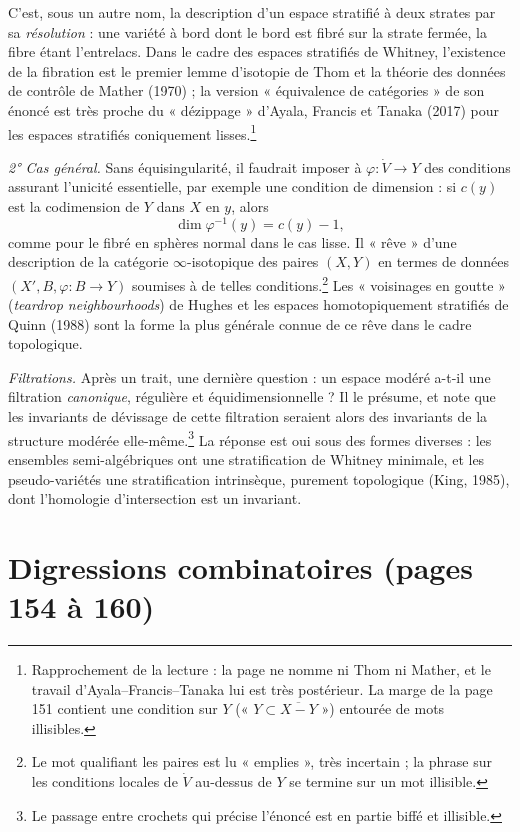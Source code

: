 \documentclass[11pt,a4paper]{article}
\begin{document}
C'est, sous un autre nom, la description d'un espace stratifié à deux strates
par sa \emph{résolution} : une variété à bord dont le bord est fibré sur la
strate fermée, la fibre étant l'entrelacs. Dans le cadre des espaces
stratifiés de Whitney, l'existence de la fibration est le premier lemme
d'isotopie de Thom et la théorie des données de contrôle de Mather (1970) ;
la version « équivalence de catégories » de son énoncé est très proche du
« dézippage » d'Ayala, Francis et Tanaka (2017) pour les espaces stratifiés
coniquement lisses.\footnote{Rapprochement de la lecture : la page ne nomme
ni Thom ni Mather, et le travail d'Ayala--Francis--Tanaka lui est très
postérieur. La marge de la page 151 contient une condition sur $Y$ (« $Y
\subset \overline{X - Y}$ ») entourée de mots illisibles.}

\emph{2° Cas général.} Sans équisingularité, il faudrait imposer à
$\varphi \colon \dot V \to Y$ des conditions assurant l'unicité essentielle,
par exemple une condition de dimension : si $c(y)$ est la codimension de $Y$
dans $X$ en $y$, alors
\[
  \dim \varphi^{-1}(y) = c(y) - 1,
\]
comme pour le fibré en sphères normal dans le cas lisse. Il « rêve » d'une
description de la catégorie $\infty$-isotopique des paires $(X, Y)$ en termes
de données $(X', B, \varphi \colon B \to Y)$ soumises à de telles
conditions.\footnote{Le mot qualifiant les paires est lu « emplies », très
incertain ; la phrase sur les conditions locales de $\dot V$ au-dessus de
$Y$ se termine sur un mot illisible.} Les « voisinages en goutte »
(\emph{teardrop neighbourhoods}) de Hughes et les espaces homotopiquement
stratifiés de Quinn (1988) sont la forme la plus générale connue de ce rêve
dans le cadre topologique.

\emph{Filtrations.} Après un trait, une dernière question : un espace modéré
a-t-il une filtration \emph{canonique}, régulière et équidimensionnelle ? Il
le présume, et note que les invariants de dévissage de cette filtration
seraient alors des invariants de la structure modérée elle-même.\footnote{Le
passage entre crochets qui précise l'énoncé est en partie biffé et
illisible.} La réponse est oui sous des formes diverses : les ensembles
semi-algébriques ont une stratification de Whitney minimale, et les
pseudo-variétés une stratification intrinsèque, purement topologique (King,
1985), dont l'homologie d'intersection est un invariant.

\section*{Digressions combinatoires (pages 154 à 160)}
\end{document}
